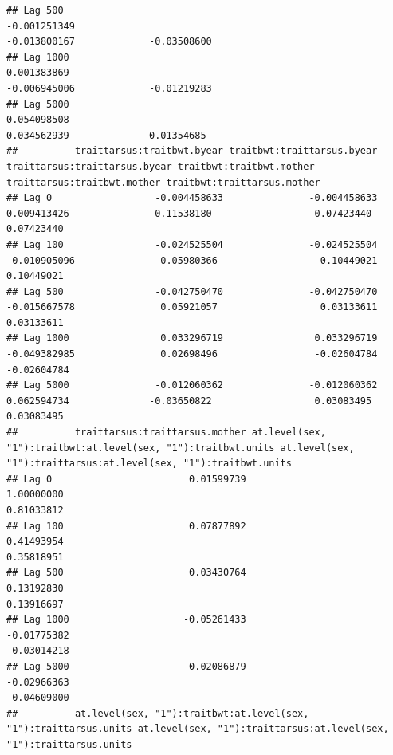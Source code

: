 \documentclass[
  12pt,
]{book}
\begin{document}
\begin{verbatim}
## Lag 500                                                       -0.001251349                                                         -0.013800167             -0.03508600
## Lag 1000                                                       0.001383869                                                         -0.006945006             -0.01219283
## Lag 5000                                                       0.054098508                                                          0.034562939              0.01354685
##          traittarsus:traitbwt.byear traitbwt:traittarsus.byear traittarsus:traittarsus.byear traitbwt:traitbwt.mother traittarsus:traitbwt.mother traitbwt:traittarsus.mother
## Lag 0                  -0.004458633               -0.004458633                   0.009413426               0.11538180                  0.07423440                  0.07423440
## Lag 100                -0.024525504               -0.024525504                  -0.010905096               0.05980366                  0.10449021                  0.10449021
## Lag 500                -0.042750470               -0.042750470                  -0.015667578               0.05921057                  0.03133611                  0.03133611
## Lag 1000                0.033296719                0.033296719                  -0.049382985               0.02698496                 -0.02604784                 -0.02604784
## Lag 5000               -0.012060362               -0.012060362                   0.062594734              -0.03650822                  0.03083495                  0.03083495
##          traittarsus:traittarsus.mother at.level(sex, "1"):traitbwt:at.level(sex, "1"):traitbwt.units at.level(sex, "1"):traittarsus:at.level(sex, "1"):traitbwt.units
## Lag 0                        0.01599739                                                    1.00000000                                                       0.81033812
## Lag 100                      0.07877892                                                    0.41493954                                                       0.35818951
## Lag 500                      0.03430764                                                    0.13192830                                                       0.13916697
## Lag 1000                    -0.05261433                                                   -0.01775382                                                      -0.03014218
## Lag 5000                     0.02086879                                                   -0.02966363                                                      -0.04609000
##          at.level(sex, "1"):traitbwt:at.level(sex, "1"):traittarsus.units at.level(sex, "1"):traittarsus:at.level(sex, "1"):traittarsus.units

\end{verbatim}
\end{document}
